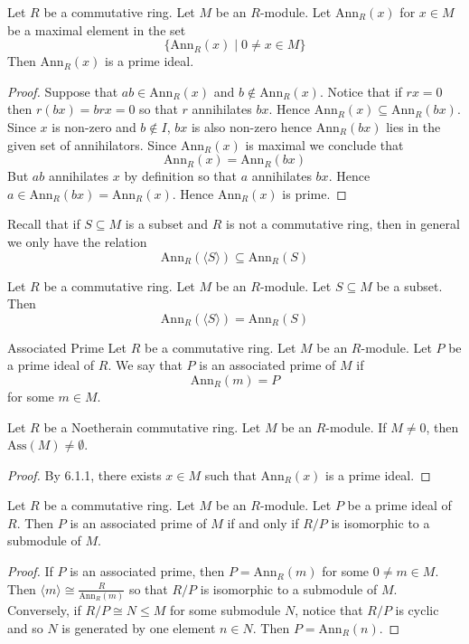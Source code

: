 \documentclass[a4paper]{article}
\begin{document}
\begin{prp}{}{} Let $R$ be a commutative ring. Let $M$ be an $R$-module. Let $\text{Ann}_R(x)$ for $x\in M$ be a maximal element in the set $$\{\text{Ann}_R(x)\;|\;0\neq x\in M\}$$ Then $\text{Ann}_R(x)$ is a prime ideal. 
\begin{proof}
Suppose that $ab\in\text{Ann}_R(x)$ and $b\notin\text{Ann}_R(x)$. Notice that if $rx=0$ then $r(bx)=brx=0$ so that $r$ annihilates $bx$. Hence $\text{Ann}_R(x)\subseteq\text{Ann}_R(bx)$. Since $x$ is non-zero and $b\notin I$, $bx$ is also non-zero hence $\text{Ann}_R(bx)$ lies in the given set of annihilators. Since $\text{Ann}_R(x)$ is maximal we conclude that $$\text{Ann}_R(x)=\text{Ann}_R(bx)$$ But $ab$ annihilates $x$ by definition so that $a$ annihilates $bx$. Hence $a\in\text{Ann}_R(bx)=\text{Ann}_R(x)$. Hence $\text{Ann}_R(x)$ is prime. 
\end{proof}
\end{prp}

Recall that if $S\subseteq M$ is a subset and $R$ is not a commutative ring, then in general we only have the relation $$\text{Ann}_R(\langle S\rangle)\subseteq\text{Ann}_R(S)$$

\begin{prp}{}{} Let $R$ be a commutative ring. Let $M$ be an $R$-module. Let $S\subseteq M$ be a subset. Then $$\text{Ann}_R(\langle S\rangle)=\text{Ann}_R(S)$$
\end{prp}

\begin{defn}{Associated Prime}{} Let $R$ be a commutative ring. Let $M$ be an $R$-module. Let $P$ be a prime ideal of $R$. We say that $P$ is an associated prime of $M$ if $$\text{Ann}_R(m)=P$$ for some $m\in M$. 
\end{defn}

\begin{lmm}{}{} Let $R$ be a Noetherain commutative ring. Let $M$ be an $R$-module. If $M\neq 0$, then $\text{Ass}(M)\neq\emptyset$. 
\begin{proof}
By 6.1.1, there exists $x\in M$ such that $\text{Ann}_R(x)$ is a prime ideal. 
\end{proof}
\end{lmm}

\begin{lmm}{}{} Let $R$ be a commutative ring. Let $M$ be an $R$-module. Let $P$ be a prime ideal of $R$. Then $P$ is an associated prime of $M$ if and only if $R/P$ is isomorphic to a submodule of $M$. 
\begin{proof}
If $P$ is an associated prime, then $P=\text{Ann}_R(m)$ for some $0\neq m\in M$. Then $\langle m\rangle\cong\frac{R}{\text{Ann}_R(m)}$ so that $R/P$ is isomorphic to a submodule of $M$. Conversely, if $R/P\cong N\leq M$ for some submodule $N$, notice that $R/P$ is cyclic and so $N$ is generated by one element $n\in N$. Then $P=\text{Ann}_R(n)$. 
\end{proof}
\end{lmm}
\end{document}
